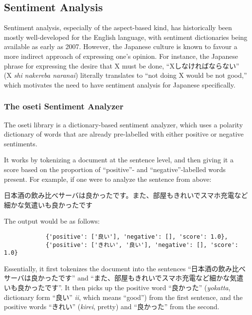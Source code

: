 \documentclass[12pt]{article}
\begin{document}
	\subsection{Sentiment Analysis}
	
	Sentiment analysis, especially of the aspect-based kind, has historically been mostly well-developed for the English language, with sentiment dictionaries being available as early as 2007. However, the Japanese culture is known to favour a more indirect approach of expressing one's opinion. For instance, the Japanese phrase for expressing the desire that X must be done, ``Xしなければならない'' (X \textit{shi nakereba naranai}) literally translates to ``not doing X would be not good,'' which motivates the need to have sentiment analysis for Japanese specifically.
	
	\subsubsection{The oseti Sentiment Analyzer}
	
	The oseti library is a dictionary-based sentiment analyzer, which uses a polarity dictionary of words that are already pre-labelled with either positive or negative sentiments.
	
	It works by tokenizing a document at the sentence level, and then giving it a score based on the proportion of ``positive''- and ``negative''-labelled words present. For example, if one were to analyze the sentence from above: \begin{flushleft}
		日本酒の飲み比べサーバは良かったです。また、部屋もきれいでスマホ充電など細かな気遣いも良かったです
	\end{flushleft} 
	The output would be as follows: \begin{center}
		\begin{verbatim}
			{'positive': ['良い'], 'negative': [], 'score': 1.0},
			{'positive': ['きれい', '良い'], 'negative': [], 'score': 1.0}
		\end{verbatim}
	\end{center}
	
	Essentially, it first tokenizes the document into the sentences ``日本酒の飲み比べサーバは良かったです'' and ``また、部屋もきれいでスマホ充電など細かな気遣いも良かったです''. It then picks up the positive word ``良かった'' (\textit{yokatta}, dictionary form ``良い'' \textit{ii}, which means ``good'') from the first sentence, and the positive words ``きれい'' (\textit{kirei}, pretty) and ``良かった'' from the second.
	
\end{document}
